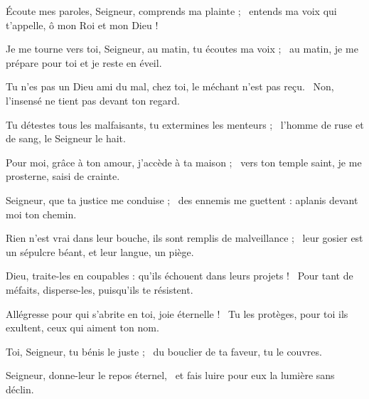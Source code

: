 \item Écoute mes paroles, Seigneur, comprends ma plainte ;~\psstar{} entends ma voix qui t'appelle, ô mon Roi et mon Dieu !

\item Je me tourne vers toi, Seigneur, au matin, tu écoutes ma voix ;~\psstar{} au matin, je me prépare pour toi et je reste en éveil.

\item Tu n'es pas un Dieu ami du mal, chez toi, le méchant n'est pas reçu.~\psstar{} Non, l'insensé ne tient pas devant ton regard. 

\item Tu détestes tous les malfaisants, tu extermines les menteurs ;~\psstar{} l'homme de ruse et de sang, le Seigneur le hait.

\item Pour moi, grâce à ton amour, j'accède à ta maison ;~\psstar{} vers ton temple saint, je me prosterne, saisi de crainte.

\item Seigneur, que ta justice me conduise ;~\psstar{} des ennemis me guettent : aplanis devant moi ton chemin.

\item Rien n'est vrai dans leur bouche, ils sont remplis de malveillance ;~\psstar{} leur gosier est un sépulcre béant, et leur langue, un piège.

\item Dieu, traite-les en coupables : qu'ils échouent dans leurs projets !~\psstar{} Pour tant de méfaits, disperse-les, puisqu'ils te résistent.

\item Allégresse pour qui s'abrite en toi, joie éternelle !~\psstar{} Tu les protèges, pour toi ils exultent, ceux qui aiment ton nom.

\item Toi, Seigneur, tu bénis le juste ;~\psstar{} du bouclier de ta faveur, tu le couvres.

\item Seigneur, donne-leur le repos éternel,~\psstar{} et fais luire pour eux la lumière sans déclin.